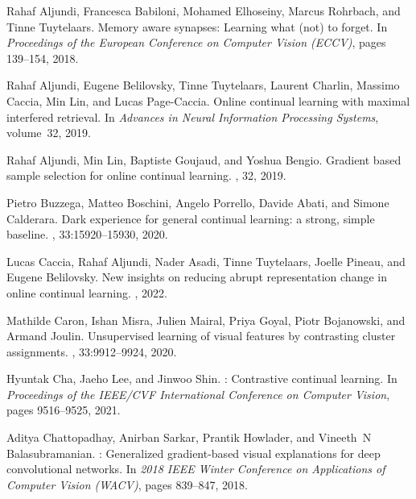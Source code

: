 \documentclass[10pt,twocolumn,letterpaper]{article}
\begin{document}
{\small

\begin{thebibliography}{10}\itemsep=-1pt

Rahaf Aljundi, Francesca Babiloni, Mohamed Elhoseiny, Marcus Rohrbach, and
  Tinne Tuytelaars.
\newblock Memory aware synapses: Learning what (not) to forget.
\newblock In {\em Proceedings of the European Conference on Computer Vision
  (ECCV)}, pages 139--154, 2018.

Rahaf Aljundi, Eugene Belilovsky, Tinne Tuytelaars, Laurent Charlin, Massimo
  Caccia, Min Lin, and Lucas Page-Caccia.
\newblock Online continual learning with maximal interfered retrieval.
\newblock In {\em Advances in Neural Information Processing Systems},
  volume~32, 2019.

Rahaf Aljundi, Min Lin, Baptiste Goujaud, and Yoshua Bengio.
\newblock Gradient based sample selection for online continual learning.
, 32, 2019.

Pietro Buzzega, Matteo Boschini, Angelo Porrello, Davide Abati, and Simone
  Calderara.
\newblock Dark experience for general continual learning: a strong, simple
  baseline.
,
  33:15920--15930, 2020.

Lucas Caccia, Rahaf Aljundi, Nader Asadi, Tinne Tuytelaars, Joelle Pineau, and
  Eugene Belilovsky.
\newblock New insights on reducing abrupt representation change in online
  continual learning.
, 2022.

Mathilde Caron, Ishan Misra, Julien Mairal, Priya Goyal, Piotr Bojanowski, and
  Armand Joulin.
\newblock Unsupervised learning of visual features by contrasting cluster
  assignments.
,
  33:9912--9924, 2020.

Hyuntak Cha, Jaeho Lee, and Jinwoo Shin.
: Contrastive continual learning.
\newblock In {\em Proceedings of the IEEE/CVF International Conference on
  Computer Vision}, pages 9516--9525, 2021.

Aditya Chattopadhay, Anirban Sarkar, Prantik Howlader, and Vineeth~N
  Balasubramanian.
: Generalized gradient-based visual explanations for deep
  convolutional networks.
\newblock In {\em 2018 IEEE Winter Conference on Applications of Computer
  Vision (WACV)}, pages 839--847, 2018.


\end{thebibliography}}
\end{document}
